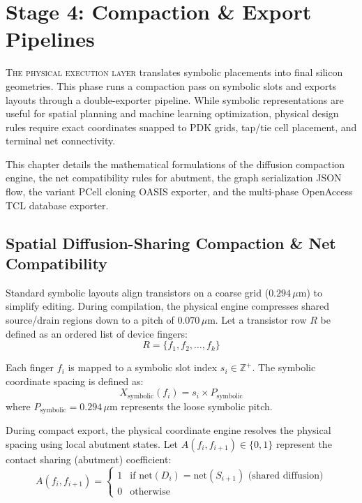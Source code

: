 
\chapter[Compaction \& Export Pipelines]{Stage 4: Compaction \& Export Pipelines}
\label{ch:compaction_exporter}

\lettrine[lines=3]{T}{he physical execution layer} translates symbolic placements into final silicon geometries. This phase runs a compaction pass on symbolic slots and exports layouts through a double-exporter pipeline. While symbolic representations are useful for spatial planning and machine learning optimization, physical design rules require exact coordinates snapped to PDK grids, tap/tie cell placement, and terminal net connectivity. 

This chapter details the mathematical formulations of the diffusion compaction engine, the net compatibility rules for abutment, the graph serialization JSON flow, the variant PCell cloning OASIS exporter, and the multi-phase OpenAccess TCL database exporter.

\section[Diffusion Compaction]{Spatial Diffusion-Sharing Compaction \& Net Compatibility}
\label{sec:compaction_math}

Standard symbolic layouts align transistors on a coarse grid ($0.294\,\mu\text{m}$) to simplify editing. During compilation, the physical engine compresses shared source/drain regions down to a pitch of $0.070\,\mu\text{m}$. Let a transistor row $R$ be defined as an ordered list of device fingers:
\[R = \{f_1, f_2, \dots, f_k\}\]

Each finger $f_i$ is mapped to a symbolic slot index $s_i \in \mathbb{Z}^+$. The symbolic coordinate spacing is defined as:
\[X_{\text{symbolic}}(f_i) = s_i \times P_{\text{symbolic}}\]
where $P_{\text{symbolic}} = 0.294\,\mu\text{m}$ represents the loose symbolic pitch.

During compact export, the physical coordinate engine resolves the physical spacing using local abutment states. Let $A(f_i, f_{i+1}) \in \{0, 1\}$ represent the contact sharing (abutment) coefficient:
\[A(f_i, f_{i+1}) = \begin{cases} 
1 & \text{if } \text{net}(D_i) = \text{net}(S_{i+1}) \text{ (shared diffusion)} \\ 
0 & \text{otherwise} 
\end{cases}\]

